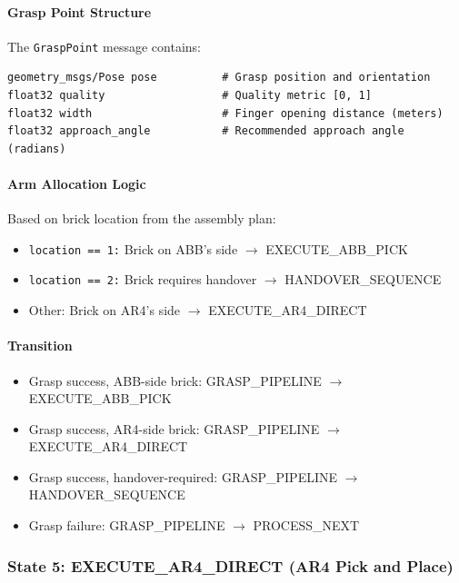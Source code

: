 \paragraph{Grasp Point Structure}

The \texttt{GraspPoint} message contains:
\begin{verbatim}
geometry_msgs/Pose pose          # Grasp position and orientation
float32 quality                  # Quality metric [0, 1]
float32 width                    # Finger opening distance (meters)
float32 approach_angle           # Recommended approach angle (radians)
\end{verbatim}

\paragraph{Arm Allocation Logic}

Based on brick location from the assembly plan:
\begin{itemize}
    \item \texttt{location == 1:} Brick on ABB's side $\rightarrow$ EXECUTE\_ABB\_PICK
    \item \texttt{location == 2:} Brick requires handover $\rightarrow$ HANDOVER\_SEQUENCE
    \item Other: Brick on AR4's side $\rightarrow$ EXECUTE\_AR4\_DIRECT
\end{itemize}

\paragraph{Transition}

\begin{itemize}
    \item Grasp success, ABB-side brick: GRASP\_PIPELINE $\rightarrow$ EXECUTE\_ABB\_PICK
    \item Grasp success, AR4-side brick: GRASP\_PIPELINE $\rightarrow$ EXECUTE\_AR4\_DIRECT
    \item Grasp success, handover-required: GRASP\_PIPELINE $\rightarrow$ HANDOVER\_SEQUENCE
    \item Grasp failure: GRASP\_PIPELINE $\rightarrow$ PROCESS\_NEXT
\end{itemize}

\subsubsection{State 5: EXECUTE\_AR4\_DIRECT (AR4 Pick and Place)}
\label{state:executeAR4direct}

